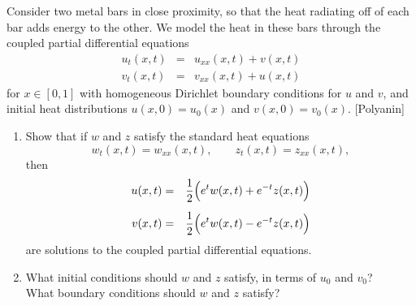 Consider two metal bars in close proximity, so that the heat radiating
off of each bar adds energy to the other.  
We model the heat in these bars through the coupled partial differential
equations
\begin{eqnarray*}
 u_t(x,t) &=& u_{xx}(x,t) + v(x,t) \\[0.5em]
 v_t(x,t) &=& v_{xx}(x,t) + u(x,t)
\end{eqnarray*}
for $x\in[0,1]$ with homogeneous Dirichlet boundary conditions for
$u$ and $v$, and initial heat distributions $u(x,0) = u_0(x)$ and
$v(x,0) = v_0(x)$.  [Polyanin]

\vspace*{1em}

\begin{enumerate}
\item
Show that if $w$ and $z$ satisfy the standard heat equations
\[ w_{t}(x,t) = w_{xx}(x,t), \qquad
   z_{t}(x,t) = z_{xx}(x,t),\]
then
\begin{eqnarray*}
   u(x,t) &=& {1\over 2}\Big( e^t w(x,t) + e^{-t} z(x,t)\Big)\\[.5em]
   v(x,t) &=& {1\over 2}\Big( e^t w(x,t) - e^{-t} z(x,t)\Big)
\end{eqnarray*}
are solutions to the coupled partial differential equations.

\vspace*{1em}
\item
What initial conditions should $w$ and $z$ satisfy, in terms of
$u_0$ and $v_0$?\\[.5em]
What boundary conditions should $w$ and $z$ satisfy?
\end{enumerate}


